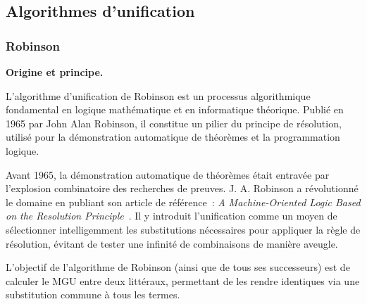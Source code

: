 \documentclass[11pt]{article}
\newenvironment{paraph}[1]{%
  \medskip
  \noindent\textbf{#1.}\quad

  \vspace{0.2cm}
}{%
  \medskip
}
\begin{document}
\subsection{Algorithmes d'unification}
\subsubsection{Robinson}\label{sec:rob}

\begin{paraph}{Origine et principe}
    L'algorithme d'unification de Robinson est un processus algorithmique 
    fondamental en logique mathématique et en informatique théorique. 
    Publié en 1965 par John Alan Robinson, il constitue un pilier du 
    principe de résolution, utilisé pour la démonstration automatique 
    de théorèmes et la programmation logique.

    \vspace{0.2cm}
    Avant 1965, la démonstration automatique de théorèmes était entravée 
    par l'explosion combinatoire des recherches de preuves. J. A. 
    Robinson a révolutionné le domaine en publiant son article de 
    référence~: \textit{A Machine-Oriented Logic Based on the Resolution 
    Principle}~\cite{robinson1965machine}. Il y introduit l'unification comme un moyen de 
    sélectionner intelligemment les substitutions nécessaires pour 
    appliquer la règle de résolution, évitant de tester une infinité 
    de combinaisons de manière aveugle.

    \vspace{0.2cm}
    L'objectif de l'algorithme de Robinson (ainsi que de tous ses 
    successeurs) est de calculer le MGU entre deux littéraux, 
    permettant de les rendre identiques via une substitution commune 
    à tous les termes.
\end{paraph}
\end{document}
